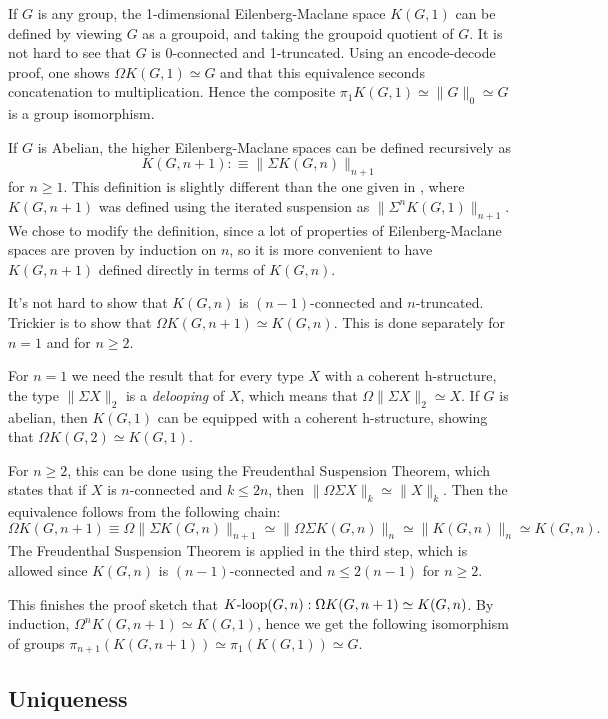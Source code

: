 \documentclass{article}
\newcommand{\Kloop}{K\textnormal{-loop}}
\theoremstyle{definition}
\theoremstyle{remark}
\begin{document}
If $G$ is any group, the 1-dimensional Eilenberg-Maclane space $K(G,1)$ can be defined by viewing
$G$ as a groupoid, and taking the groupoid quotient of $G$. It is not hard to see that $G$ is
0-connected and 1-truncated. Using an encode-decode proof, one shows $\Omega K(G,1) \simeq G$ and
that this equivalence seconds concatenation to multiplication. Hence the composite
$\pi_1K(G,1)\simeq \|G\|_0\simeq G$ is a group isomorphism.

If $G$ is Abelian, the higher Eilenberg-Maclane spaces can be defined recursively
as $$K(G,n+1):\equiv \|\Sigma K(G,n)\|_{n+1}$$ for $n\geq 1$. This definition is slightly different
than the one given in \cite{Licata2014EM}, where $K(G,n+1)$ was defined using the iterated
suspension as $\|\Sigma^n K(G,1)\|_{n+1}$. We chose to modify the definition, since a lot of
properties of Eilenberg-Maclane spaces are proven by induction on $n$, so it is more convenient to
have $K(G,n+1)$ defined directly in terms of $K(G,n)$.

It's not hard to show that $K(G,n)$ is $(n-1)$-connected and $n$-truncated. Trickier is to show that
$\Omega K(G,n+1)\simeq K(G,n)$. This is done separately for $n=1$ and for $n\geq 2$.

For $n=1$ we need the result that for every type $X$ with a coherent h-structure, the type $\|\Sigma
X\|_2$ is a \emph{delooping} of $X$, which means that $\Omega \|\Sigma X\|_2 \simeq X$. If $G$ is abelian, then $K(G,1)$ can be equipped with a coherent h-structure,
showing that $\Omega K(G,2)\simeq K(G,1)$.

For $n\geq 2$, this can be done using the Freudenthal Suspension Theorem, which states that if $X$
is $n$-connected and $k\leq 2n$, then $\|\Omega\Sigma X\|_k\simeq \|X\|_k$. Then the equivalence
follows from the following chain:
$$\Omega K(G,n+1)\equiv \Omega\|\Sigma K(G,n)\|_{n+1}\simeq \|\Omega\Sigma K(G,n)\|_n\simeq
\|K(G,n)\|_n\simeq K(G,n).$$ The Freudenthal Suspension Theorem is applied in the third step, which
is allowed since $K(G,n)$ is $(n-1)$-connected and $n \leq 2(n-1)$ for $n\geq2$.

This finishes the proof sketch that $\Kloop(G,n):\Omega K(G,n+1)\simeq K(G,n)$. By induction,
$\Omega^n K(G,n+1)\simeq K(G,1)$, hence we get the following isomorphism of groups
$\pi_{n+1}(K(G,n+1))\simeq \pi_1(K(G,1))\simeq G$.

\subsection{Uniqueness}
\end{document}
